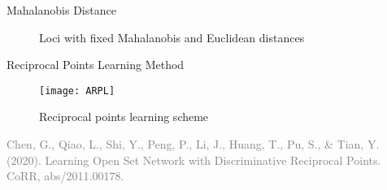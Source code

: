 \begin{frame}{Mahalanobis Distance}
\begin{minipage}{0.49\textwidth}
\begin{figure}[h]
{
              }
              \caption*{\footnotesize{  Loci with fixed Mahalanobis and Euclidean distances}} %
          \end{figure}
  \end{minipage}
\end{frame}

\begin{frame}{Reciprocal Points Learning Method}
  \begin{figure}
      \centering
      \texttt{[image: ARPL]}
      \caption*{Reciprocal points learning scheme}
  \end{figure}
  \hspace*{50px}
  \begin{flushright}
    \tiny{\textcolor{gray}{Chen, G., Qiao, L., Shi, Y., Peng, P., Li, J., Huang, T., Pu, S., \& Tian, Y. (2020). Learning Open Set Network with Discriminative Reciprocal Points. CoRR, abs/2011.00178. }}
  \end{flushright}
\end{frame}

